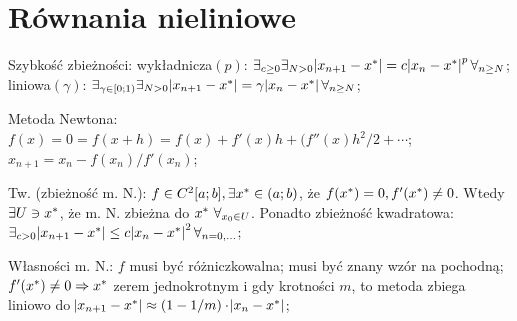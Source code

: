 \section{Równania nieliniowe}



\entry
Szybkość zbieżności:
wykładnicza$(p)$:
$\exists_{c \geq 0} \exists_{N > 0}
\abs{x_{n + 1} - x^{*}} = c \abs{x_n - x^{*}}^p \forall_{n \geq N}$;
liniowa$(\gamma)$:
$\exists_{\gamma \in [0;1)} \exists_{N > 0}
\abs{x_{n + 1} - x^{*}} = \gamma \abs{x_n - x^{*}} \forall_{n \geq N}$;

\entry
Metoda Newtona:
$f(x) = 0 = f(x+h) = f(x) + f'(x)h + (f''(x)h^2/2+\cdots$;
$x_{n+1} = x_n - f(x_n)/f'(x_n)$;

\entry
Tw. (zbieżność m. N.):
$f \in C^2[a;b], \exists x^{*} \in (a;b)$,
że $f(x^{*})=0, f'(x^{*}) \neq 0$.
Wtedy $\exists{U \ni x^{*}}$, że m. N. zbieżna do $x^{*} \ \forall_{x_0 \in U}$.
Ponadto zbieżność kwadratowa:
$\exists_{c>0} \abs{x_{n+1} - x^{*}} \leq c \abs{x_n - x^{*}}^2 \forall_{n=0,\ldots}$;

\entry
Własności m. N.:
\subentry
$f$ musi być różniczkowalna;
\subentry
musi być znany wzór na pochodną;
\subentry
$f'(x^{*}) \neq 0 \Rightarrow x^{*}$ zerem jednokrotnym i gdy krotności $m$, 
to metoda zbiega liniowo do 
$\abs{x_{n+1} - x^{*}} \approx (1-1/m) \cdot \abs{x_n - x^{*}}$;







